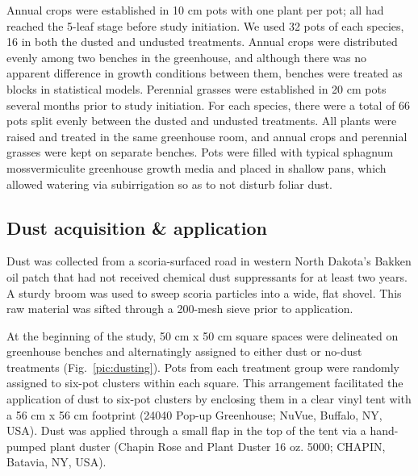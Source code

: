 \documentclass{svjour3}
\begin{document}
Annual crops were established in 10 cm pots with one plant per pot; all had reached the 5-leaf stage before study initiation.
We used 32 pots of each species, 16 in both the dusted and undusted treatments.
Annual crops were distributed evenly among two benches in the greenhouse, and although there was no apparent difference in growth conditions between them, benches were treated as blocks in statistical models.
Perennial grasses were established in 20 cm pots several months prior to study initiation. 
For each species, there were a total of 66 pots split evenly between the dusted and undusted treatments.
All plants were raised and treated in the same greenhouse room, and annual crops and perennial grasses were kept on separate benches. 
Pots were filled with typical sphagnum moss\textendash vermiculite greenhouse growth media and placed in shallow pans, which allowed watering via subirrigation so as to not disturb foliar dust.  


\subsection{Dust acquisition \& application}

Dust was collected from a scoria-surfaced road in western North Dakota's Bakken oil patch that had not received chemical dust suppressants for at least two years.
A sturdy broom was used to sweep scoria particles into a wide, flat shovel. 
This raw material was sifted through a 200-mesh sieve prior to application.  

At the beginning of the study, 50 cm x 50 cm square spaces were delineated on greenhouse benches and alternatingly assigned to either dust or no-dust treatments (Fig.~\ref{pic:dusting}). 
Pots from each treatment group were randomly assigned to six-pot clusters within each square. 
This arrangement facilitated the application of dust to six-pot clusters by enclosing them in a clear vinyl tent with a 56 cm x 56 cm footprint (24040 Pop-up Greenhouse; NuVue, Buffalo, NY, USA). 
Dust was applied through a small flap in the top of the tent via a hand-pumped plant duster (Chapin Rose and Plant Duster 16 oz. 5000; CHAPIN, Batavia, NY, USA). 
\end{document}
